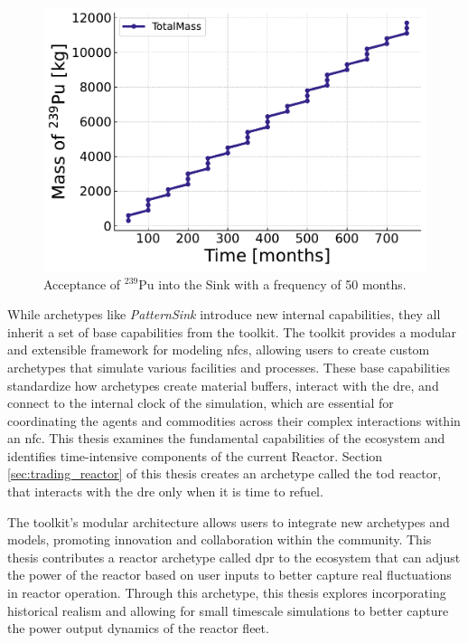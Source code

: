 \begin{figure}[H]
    \centering
    \includegraphics[scale=0.7]{images/cyclus/pattern_sink_fuel_transactions.pdf}
    \caption{Acceptance of $^{239}$Pu into the Sink with a frequency of 50 months.}
    \label{fig:pattern_freq_50}
\end{figure}

While archetypes like \textit{PatternSink} introduce new internal capabilities, they all inherit a set of base capabilities from the \cyclus toolkit. The \cyclus toolkit provides a modular and extensible framework for modeling \glspl{nfc}, allowing users to create custom archetypes that simulate various facilities and processes. These base capabilities standardize how archetypes create material buffers, interact with the \gls{dre}, and connect to the internal clock of the simulation, which are essential for coordinating the agents and commodities across their complex interactions within an \gls{nfc}. This thesis examines the fundamental capabilities of the \cyclus ecosystem and identifies time-intensive components of the current \cycamore Reactor. Section \ref{sec:trading_reactor} of this thesis creates an archetype called the \gls{tod} reactor, that interacts with the \gls{dre} only when it is time to refuel.

The toolkit’s modular architecture allows users to integrate new archetypes and models, promoting innovation and collaboration within the \cyclus community. This thesis contributes a reactor archetype called \gls{dpr} to the ecosystem that can adjust the power of the reactor based on user inputs to better capture real fluctuations in reactor operation. Through this archetype, this thesis explores incorporating historical realism and allowing for small timescale simulations to better capture the power output dynamics of the reactor fleet.

